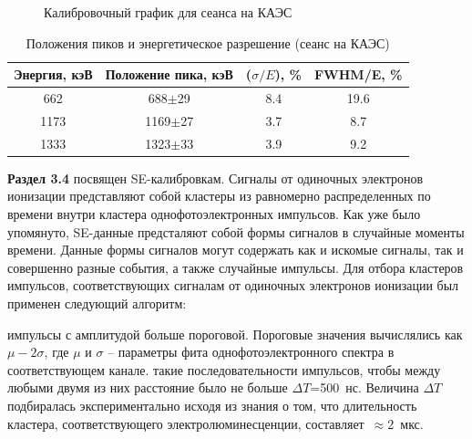 \begin{figure}[ht]
  \caption{Калибровочный график для сеанса на КАЭС}
  \label{img:calibr2022}  
\end{figure}

\begin{table}[ht]
    \centering
        \caption{Положения пиков и энергетическое разрешение (сеанс на КАЭС)}
\begin{tabular}{|c|c|c|c|}
\hline
    Энергия, кэВ & Положение пика, кэВ & ($\sigma/E$), \% & FWHM/E,  \%\\
    \hline
    662 & 688$\pm$29 & 8.4 & 19.6\\
    \hline
    1173 & 1169$\pm$27 & 3.7 & 8.7\\
    \hline
    1333 & 1323$\pm$33 & 3.9 & 9.2\\
    \hline
\end{tabular}    
\label{tab:resolution2022}
\end{table}

\textbf{Раздел 3.4} посвящен SE-калибровкам. Сигналы от одиночных электронов ионизации представляют собой кластеры из равномерно распределенных по времени внутри кластера однофотоэлектронных импульсов. Как уже было упомянуто, SE-данные предсталяют собой формы сигналов в случайные моменты времени. Данные формы сигналов могут содержать как и искомые сигналы, так и совершенно разные события, а также случайные импульсы. Для отбора кластеров импульсов, соответствующих сигналам от одиночных электронов ионизации был применен следующий алгоритм:
\begin{enumerate}
     импульсы с амплитудой больше пороговой. Пороговые значения вычислялись как $\mu-2\sigma$, где $\mu$ и $\sigma$ -- параметры фита однофотоэлектронного спектра в соответствующем канале.
     такие последовательности импульсов, чтобы между любыми двумя из них расстояние было не больше $\Delta T$=500~нс. Величина $\Delta T$ подбиралась экспериментально исходя из знания о том, что длительность кластера, соответствующего электролюминесценции, составляет~$\approx$2~мкс. 
\end{enumerate}

